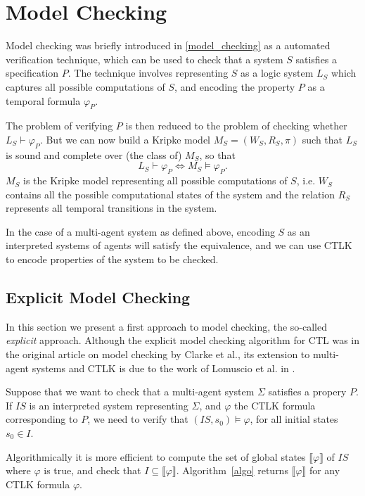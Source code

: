 \documentclass[11pt]{report}
\begin{document}
\section{Model Checking}

Model checking was briefly introduced in \ref{model_checking} as a automated verification technique, which can be used to check that a system $S$ satisfies a specification $P$. The technique involves representing $S$ as a logic system $L_S$ which captures all possible computations of $S$, and encoding the property $P$ as a temporal formula $\varphi_P$. 

The problem of verifying $P$ is then reduced to the problem of checking whether $L_S \vdash \varphi_P $. But we can now build a Kripke model $M_S = (W_S, R_S, \pi)$ such that $L_S$ is sound and complete over (the class of) $M_S$, so that $$L_S \vdash \varphi_P \Leftrightarrow M_S \models \varphi_P .$$ 
$M_S$ is the Kripke model representing all possible computations of $S$, i.e. $W_S$ contains all the possible computational states of the system and the relation $R_S$ represents all temporal transitions in the system. 

In the case of a multi-agent system as defined above, encoding $S$ as an interpreted systems of agents will satisfy the equivalence, and we can use CTLK to encode properties of the system to be checked. 

\subsection{Explicit Model Checking}

\label{explicit}
In this section we present a first approach to model checking, the so-called \textit{explicit} approach. Although the explicit model checking algorithm for CTL was in the original article on model checking by Clarke et al.\cite{original_model_checking}, its extension to multi-agent systems and CTLK is due to the work of Lomuscio et al. in \cite{mas_verification}.

Suppose that we want to check that a multi-agent system $\Sigma$ satisfies a propery $P$. If $IS$ is an interpreted system representing $\Sigma$, and $\varphi$ the CTLK formula corresponding to $P$, we need to verify that $(IS, s_0) \models \varphi$, for all initial states $s_0 \in I$.

Algorithmically it is more efficient \cite{need ref} to compute the set of global states $\llbracket\varphi\rrbracket$ of $IS$ where $\varphi$ is true, and check that $I \subseteq \llbracket\varphi\rrbracket$. 
Algorithm~\ref{algo} returns $\llbracket\varphi\rrbracket$ for any CTLK formula $\varphi$.
\end{document}
